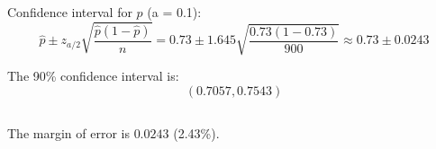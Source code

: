 \documentclass{homework}
\begin{document}
\section{}

\subsection{}

Confidence interval for \(p\) (a = 0.1):
\[
\hat{p} \pm z_{a/2} \sqrt{\frac{\hat{p}(1 - \hat{p})}{n}} = 0.73 \pm 1.645 \sqrt{\frac{0.73(1 - 0.73)}{900}} \approx 0.73 \pm 0.0243
\]

The 90\% confidence interval is:
\[
(0.7057, 0.7543)
\]

\subsection{}

The margin of error is \(0.0243\) (2.43\%).
\end{document}
